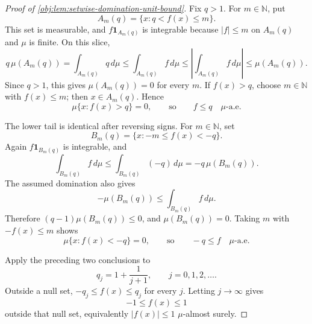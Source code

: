 \begin{proof}[Proof of \cref{obj:lem:setwise-domination-unit-bound}]
Fix \(q>1\).  For \(m\in\mathbb N\), put
\[
A_m(q)=\{x:q<f(x)\le m\}.
\]
This set is measurable, and \(f\mathbf 1_{A_m(q)}\) is integrable because \(|f|\le m\) on \(A_m(q)\) and \(\mu\) is finite.  On this slice,
\[
q\,\mu(A_m(q))
=
\int_{A_m(q)}q\,d\mu
\le
\int_{A_m(q)}f\,d\mu
\le
\left|\int_{A_m(q)}f\,d\mu\right|
\le
\mu(A_m(q)).
\]
Since \(q>1\), this gives \(\mu(A_m(q))=0\) for every \(m\). %
If \(f(x)>q\), choose \(m\in\mathbb N\) with \(f(x)\le m\); then \(x\in A_m(q)\).  Hence
\[
\mu\{x:f(x)>q\}=0,
\qquad\text{so}\qquad
f\le q\quad \mu\text{-a.e.}
\]

The lower tail is identical after reversing signs.  For \(m\in\mathbb N\), set
\[
B_m(q)=\{x:-m\le f(x)<-q\}.
\]
Again \(f\mathbf 1_{B_m(q)}\) is integrable, and
\[
\int_{B_m(q)}f\,d\mu
\le
\int_{B_m(q)}(-q)\,d\mu
=
-q\,\mu(B_m(q)).
\]
The assumed domination also gives
\[
-\mu(B_m(q))
\le
\int_{B_m(q)}f\,d\mu.
\]
Therefore \((q-1)\mu(B_m(q))\le0\), and \(\mu(B_m(q))=0\).  Taking \(m\) with \(-f(x)\le m\) shows
\[
\mu\{x:f(x)<-q\}=0,
\qquad\text{so}\qquad
-q\le f\quad \mu\text{-a.e.}
\]

Apply the preceding two conclusions to
\[
q_j=1+\frac{1}{j+1},\qquad j=0,1,2,\ldots .
\]
Outside a null set, \(-q_j\le f(x)\le q_j\) for every \(j\).  Letting \(j\to\infty\) gives
\[
-1\le f(x)\le 1
\]
outside that null set, equivalently \(|f(x)|\le1\) \(\mu\)-almost surely. %
\end{proof}

